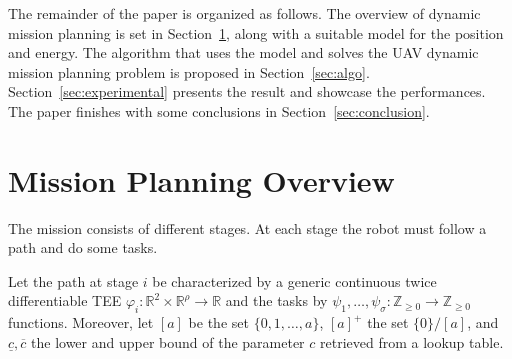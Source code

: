 \documentclass[letterpaper,10pt,conference]{ieeeconf}
\theoremstyle{definition}
\begin{document}
The remainder of the paper is organized as follows. The overview of dynamic mission planning is set in Section~\ref{sec:prob}, along with a suitable model for the position and energy. The algorithm that uses the model and solves the UAV dynamic mission planning problem is proposed in Section~\ref{sec:algo}. Section~\ref{sec:experimental} presents the result and showcase the performances. The paper finishes with some conclusions in Section~\ref{sec:conclusion}.


\section{Mission Planning Overview}
\label{sec:prob}

The mission consists of different stages. At each stage the robot must follow a path and do some tasks.

Let the path at stage $i$ be characterized by a generic continuous twice differentiable TEE $\varphi_i:\mathbb{R}^2\times\mathbb{R}^\rho\rightarrow\mathbb{R}$ and the tasks by $\psi_1,\dots,\psi_{\sigma}:\mathbb{Z}_{\geq 0}\rightarrow\mathbb{Z}_{\geq 0}$ functions. Moreover, let $[a]$ be the set $\{0,1,\dots,a\}$, $[a]^+$ the set $\{0\}/[a]$, and $\underline{c},\overline{c}$ the lower and upper bound of the parameter $c$ retrieved from a lookup table.
\end{document}
